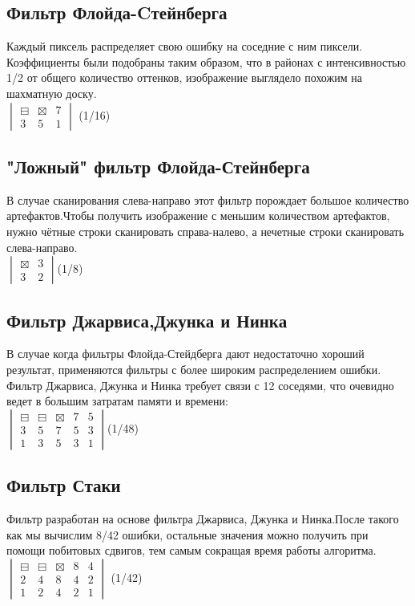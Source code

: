 \subsection{Фильтр Флойда-Cтейнберга }
Каждый пиксель распределяет свою ошибку на соседние с ним пиксели. Коэффициенты были подобраны таким образом, что в районах с  интенсивностью 1/2 от общего количество оттенков, изображение выглядело похожим на шахматную доску.\\
$  \begin{vmatrix}
\boxminus & \boxtimes & 7\\
3 & 5 & 1
\end{vmatrix}$ (1/16)
\subsection{"Ложный"  фильтр Флойда-Стейнберга }
В случае сканирования слева-направо этот фильтр порождает большое количество артефактов.Чтобы получить изображение с меньшим количеством артефактов, нужно чётные строки сканировать справа-налево, а нечетные строки сканировать слева-направо.\\
$\begin{vmatrix}
\boxtimes & 3 \\
3 & 2 
\end{vmatrix} $(1/8)

\subsection{Фильтр Джарвиса,Джунка и Нинка}
В случае когда фильтры Флойда-Стейдберга дают недостаточно хороший результат, применяются фильтры с более широким распределением ошибки. Фильтр Джарвиса, Джунка и Нинка требует связи с 12 соседями, что очевидно ведет в большим затратам памяти и времени\cite{Dh}:\\
$\begin{vmatrix}
\boxminus & \boxminus & \boxtimes & 7 & 5\\
3 & 5 & 7 & 5 &3 \\
1 & 3 & 5 & 3 & 1 
\end{vmatrix}$(1/48)

\subsection{Фильтр Стаки}
Фильтр разработан на основе фильтра Джарвиса, Джунка и Нинка.После такого как мы вычислим 8/42 ошибки, остальные значения можно получить при помощи побитовых сдвигов, тем самым сокращая время работы алгоритма.\\
$\begin{vmatrix}
\boxminus & \boxminus & \boxtimes & 8 & 4 \\
2 & 4 & 8 & 4 & 2 \\
1 & 2 & 4 & 2 & 1

\end{vmatrix}$ (1/42)

